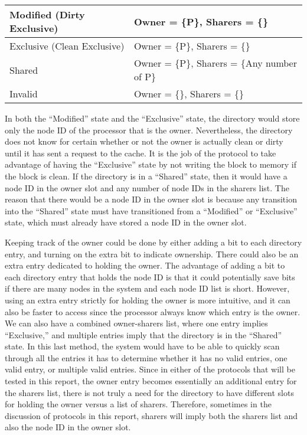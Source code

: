 \documentclass[letterpaper]{article}
\makeatletter
\newcommand\arraybslash{\let\\\@arraycr}
\makeatother
\begin{document}
\begin{center}
\label{seq:refTable0}\tablehead{\hline
\centering \bfseries Cache State &
\centering\arraybslash \bfseries Directory Data Structure\\\hline}
\begin{supertabular}{|m{3.1712599in}|m{3.1712599in}|}
Modified (Dirty Exclusive) &
Owner = \{P\}, Sharers = \{\}\\\hline
Exclusive (Clean Exclusive) &
Owner = \{P\}, Sharers = \{\}\\\hline
Shared &
Owner = \{P\}, Sharers = \{Any number of P\}\\\hline
Invalid &
Owner = \{\}, Sharers = \{\}\\\hline
\end{supertabular}
\end{center}
In both the ``Modified'' state and the ``Exclusive'' state, the directory would store only the node ID of the processor that is the owner. Nevertheless, the directory does not know for certain whether or not the owner is actually clean or dirty until it has sent a request to the cache. It is the job of the protocol to take advantage of having the ``Exclusive'' state by not writing the block to memory if the block is clean. If the directory is in a ``Shared'' state, then it would have a node ID in the owner slot and any number of node IDs in the sharers list. The reason that there would be a node ID in the owner slot is because any transition into the ``Shared'' state must have transitioned from a ``Modified'' or ``Exclusive'' state, which must already have stored a node ID in the owner slot.

Keeping track of the owner could be done by either adding a bit to each directory entry, and turning on the extra bit to indicate ownership. There could also be an extra entry dedicated to holding the owner. The advantage of adding a bit to each directory entry that holds the node ID is that it could potentially save bits if there are many nodes in the system and each node ID list is short. However, using an extra entry strictly for holding the owner is more intuitive, and it can also be faster to access since the processor always know which entry is the owner. We can also have a combined owner-sharers list, where one entry implies ``Exclusive,'' and multiple entries imply that the directory is in the ``Shared'' state. In this last method, the system would have to be able to quickly scan through all the entries it has to determine whether it has no valid entries, one valid entry, or multiple valid entries. Since in either of the protocols that will be tested in this report, the owner entry becomes essentially an additional entry for the sharers list, there is not truly a need for the directory to have different slots for holding the owner versus a list of sharers. Therefore, sometimes in the discussion of protocols in this report, sharers will imply both the sharers list and also the node ID in the owner slot.
\end{document}
